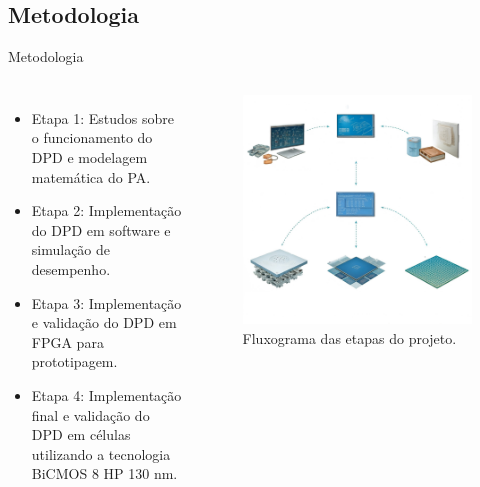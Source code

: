\documentclass{if-beamer}
\begin{document}
\subsection{Metodologia} 
\begin{frame}{Metodologia}
	\begin{columns}[T] %
		\begin{itemize}
			\item Etapa 1: Estudos sobre o funcionamento do DPD e modelagem matemática do PA.
			\item Etapa 2: Implementação do DPD em software e simulação de desempenho.
			\item Etapa 3: Implementação e validação do DPD em FPGA para prototipagem.
			\item Etapa 4: Implementação final e validação do DPD em células utilizando a tecnologia BiCMOS 8 HP 130 nm.
		\end{itemize}
		
		\begin{figure}
			\centering
			\includegraphics[scale=0.1]{diagrama.png} %
			\caption{Fluxograma das etapas do projeto.}
		\end{figure}
	\end{columns}
\end{frame}
\end{document}
